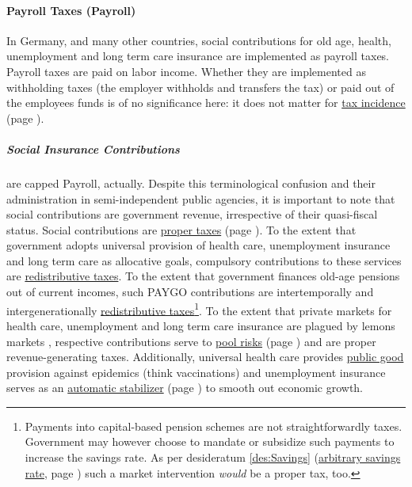 \paragraph{Payroll Taxes (Payroll)}  \label{sec:Payroll} In Germany, and many other countries, social contributions for old age, health, unemployment and long term care insurance are implemented as payroll taxes. Payroll taxes are paid on labor income. Whether they are implemented as withholding taxes (the employer withholds and transfers the tax) or paid out of the employees funds is of no significance here: it does not matter for \hyperref[sec:TaxIncidence]{tax incidence} (page \pageref{sec:TaxIncidence}). 

\subparagraph{Social Insurance Contributions}  \label{sec:SIC} are capped  \gls{Payroll}, actually. Despite this terminological confusion and their administration in semi-independent public agencies, it is important to note that social contributions are government revenue, irrespective of their quasi-fiscal status. Social contributions are \hyperref[sec:PurposesOfTaxation]{proper taxes} (page \pageref{sec:PurposesOfTaxation}). To the extent that government adopts universal provision of health care, unemployment insurance and long term care as allocative goals, compulsory contributions to these services are \hyperref[sec:Redistribution]{redistributive taxes}. To the extent that government finances old-age pensions out of current incomes, such PAYGO contributions are intertemporally and intergenerationally \hyperref[sec:Redistribution]{redistributive taxes}\footnote{
	Payments into capital-based pension schemes are not straightforwardly taxes. Government may however choose to mandate or subsidize such payments to increase the savings rate. As per desideratum \ref{des:Savings} (\hyperref[des:Savings]{arbitrary savings rate}, page \pageref{des:Savings}) such a market intervention \emph{would} be a proper tax, too.}. 
To the extent that private markets for health care, unemployment and long term care insurance are plagued by lemons markets \citep{Akerlof-1970-aa}, respective contributions serve to \hyperref[sec:RiskPooling]{pool risks} (page \pageref{sec:RiskPooling}) and are proper revenue-generating taxes. Additionally, universal health care provides \hyperref[sec:PublicGood]{public good} provision against epidemics (think vaccinations) and unemployment insurance serves as an \hyperref[des:AutomaticStabilizer]{automatic stabilizer} (page \pageref{des:AutomaticStabilizer}) to smooth out economic growth.

